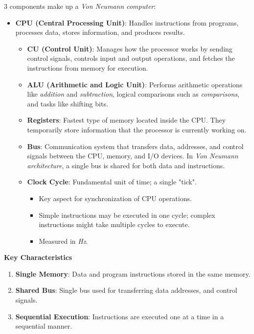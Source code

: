 \documentclass[12pt, letterpaper]{article}
\begin{document}
3 components make up a \textit{Von Neumann computer}:
\begin{itemize}
    \item \textbf{CPU (Central Processing Unit)}: Handles instructions from programs, processes data, stores information, and produces results.
        \begin{itemize}
            \item \textbf{CU (Control Unit)}: Manages how the processor works by sending control signals, controls input and output operations, and fetches the instructions from memory for execution.
            \item \textbf{ALU (Arithmetic and Logic Unit)}: Performs arithmetic operations like \textit{addition} and \textit{subtraction}, logical comparisons such as \textit{comparisons}, and tasks like shifting bits.
            \item \textbf{Registers}: Fastest type of memory located inside the CPU. They temporarily store information that the processor is currently working on. %
            \item \textbf{Bus}: Communication system that transfers data, addresses, and control signals between the CPU, memory, and I/O devices. In \textit{Von Neumann architecture}, a single bus is shared for both data and instructions.
            \item \textbf{Clock Cycle}: Fundamental unit of time; a single "tick".
                \begin{itemize}
                    \item Key aspect for synchronization of CPU operations.
                    \item Simple instructions may be executed in one cycle; complex instructions might take multiple cycles to execute.
                    \item Measured in \textit{Hz}.
                \end{itemize}
        \end{itemize}
\end{itemize}

\textbf{Key Characteristics}

\begin{enumerate}
    \item \textbf{Single Memory}: Data and program instructions stored in the same memory.
    \item \textbf{Shared Bus}: Single bus used for transferring data addresses, and control signals.
    \item \textbf{Sequential Execution}: Instructions are executed one at a time in a sequential manner.
\end{enumerate}
\end{document}

